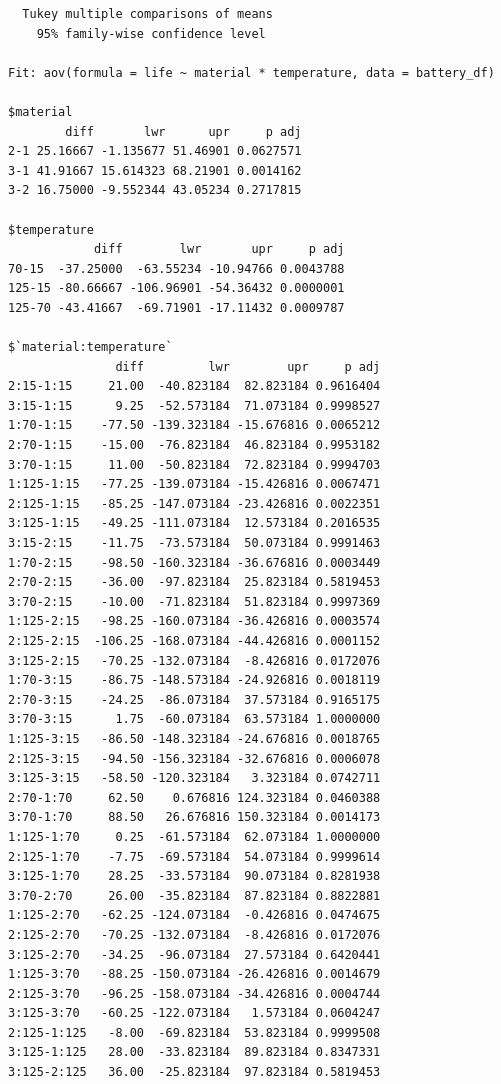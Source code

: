 \documentclass[
  letterpaper,
  DIV=11,
  numbers=noendperiod]{scrreprt}
\begin{document}
\begin{verbatim}
  Tukey multiple comparisons of means
    95% family-wise confidence level

Fit: aov(formula = life ~ material * temperature, data = battery_df)

$material
        diff       lwr      upr     p adj
2-1 25.16667 -1.135677 51.46901 0.0627571
3-1 41.91667 15.614323 68.21901 0.0014162
3-2 16.75000 -9.552344 43.05234 0.2717815

$temperature
            diff        lwr       upr     p adj
70-15  -37.25000  -63.55234 -10.94766 0.0043788
125-15 -80.66667 -106.96901 -54.36432 0.0000001
125-70 -43.41667  -69.71901 -17.11432 0.0009787

$`material:temperature`
               diff         lwr        upr     p adj
2:15-1:15     21.00  -40.823184  82.823184 0.9616404
3:15-1:15      9.25  -52.573184  71.073184 0.9998527
1:70-1:15    -77.50 -139.323184 -15.676816 0.0065212
2:70-1:15    -15.00  -76.823184  46.823184 0.9953182
3:70-1:15     11.00  -50.823184  72.823184 0.9994703
1:125-1:15   -77.25 -139.073184 -15.426816 0.0067471
2:125-1:15   -85.25 -147.073184 -23.426816 0.0022351
3:125-1:15   -49.25 -111.073184  12.573184 0.2016535
3:15-2:15    -11.75  -73.573184  50.073184 0.9991463
1:70-2:15    -98.50 -160.323184 -36.676816 0.0003449
2:70-2:15    -36.00  -97.823184  25.823184 0.5819453
3:70-2:15    -10.00  -71.823184  51.823184 0.9997369
1:125-2:15   -98.25 -160.073184 -36.426816 0.0003574
2:125-2:15  -106.25 -168.073184 -44.426816 0.0001152
3:125-2:15   -70.25 -132.073184  -8.426816 0.0172076
1:70-3:15    -86.75 -148.573184 -24.926816 0.0018119
2:70-3:15    -24.25  -86.073184  37.573184 0.9165175
3:70-3:15      1.75  -60.073184  63.573184 1.0000000
1:125-3:15   -86.50 -148.323184 -24.676816 0.0018765
2:125-3:15   -94.50 -156.323184 -32.676816 0.0006078
3:125-3:15   -58.50 -120.323184   3.323184 0.0742711
2:70-1:70     62.50    0.676816 124.323184 0.0460388
3:70-1:70     88.50   26.676816 150.323184 0.0014173
1:125-1:70     0.25  -61.573184  62.073184 1.0000000
2:125-1:70    -7.75  -69.573184  54.073184 0.9999614
3:125-1:70    28.25  -33.573184  90.073184 0.8281938
3:70-2:70     26.00  -35.823184  87.823184 0.8822881
1:125-2:70   -62.25 -124.073184  -0.426816 0.0474675
2:125-2:70   -70.25 -132.073184  -8.426816 0.0172076
3:125-2:70   -34.25  -96.073184  27.573184 0.6420441
1:125-3:70   -88.25 -150.073184 -26.426816 0.0014679
2:125-3:70   -96.25 -158.073184 -34.426816 0.0004744
3:125-3:70   -60.25 -122.073184   1.573184 0.0604247
2:125-1:125   -8.00  -69.823184  53.823184 0.9999508
3:125-1:125   28.00  -33.823184  89.823184 0.8347331
3:125-2:125   36.00  -25.823184  97.823184 0.5819453
\end{verbatim}
\end{document}
